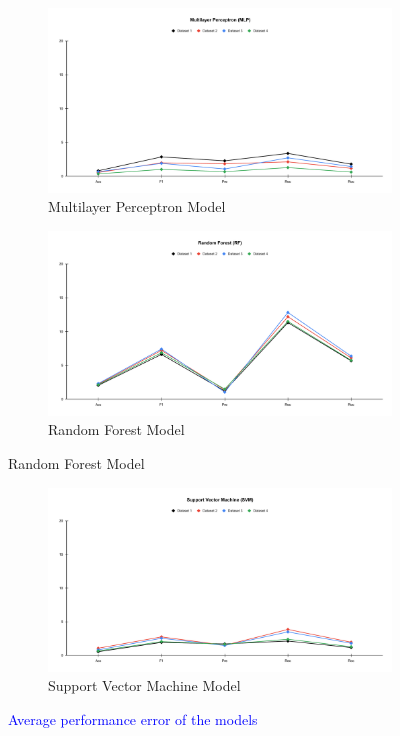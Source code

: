 \documentclass[a4paper,fleqn]{cas-dc}
\newcommand{\responsemodsm}[1]{\textcolor{blue}{#1}}
\begin{document}
\begin{figure}
    \ContinuedFloat
    \begin{subfigure}{\textwidth}
        \includegraphics[width=0.9\columnwidth]{delta_MLP.pdf}
        \caption{Multilayer Perceptron Model}\label{fig:performance_delta_mlp}
    \end{subfigure}
    \begin{subfigure}{\textwidth}
        \includegraphics[width=0.9\columnwidth]{delta_RF.pdf}
        \caption{Random Forest Model}\label{fig:performance_delta_rf}
    \end{subfigure}
\end{figure}

\begin{figure}
    \ContinuedFloat
    \begin{subfigure}{\textwidth}
        \includegraphics[width=0.9\columnwidth]{delta_SVM.pdf}
        \caption{Support Vector Machine Model}\label{fig:performance_delta_svm}
    \end{subfigure}
    \caption{\responsemodsm{Average performance error of the models}}\label{fig:average_error}
\end{figure}
\end{document}
